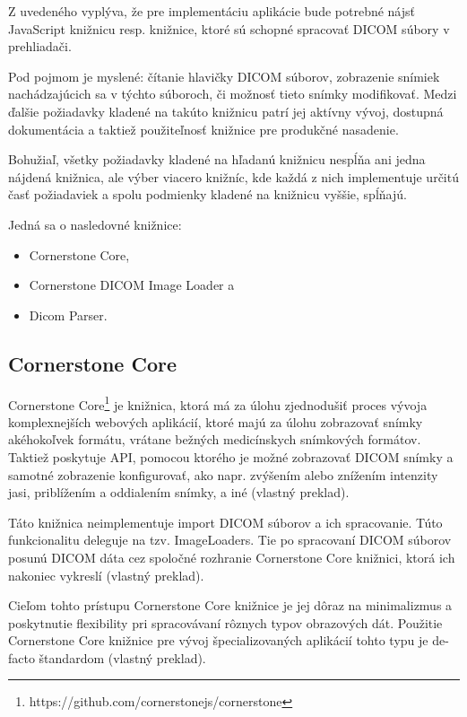 Z uvedeného vyplýva, že pre implementáciu aplikácie bude potrebné nájsť JavaScript knižnicu resp. knižnice, ktoré sú schopné spracovať DICOM súbory v prehliadači.

Pod pojmom  je myslené: čítanie hlavičky DICOM súborov, zobrazenie snímiek nachádzajúcich sa v týchto súboroch, či možnosť tieto snímky modifikovať. Medzi ďalšie požiadavky kladené na takúto knižnicu patrí jej aktívny vývoj, dostupná dokumentácia a taktiež použiteľnosť knižnice pre produkčné nasadenie.

Bohužiaľ, všetky požiadavky kladené na hľadanú knižnicu nespĺňa ani jedna nájdená knižnica, ale výber viacero knižníc, kde každá z nich implementuje určitú časť požiadaviek a spolu podmienky kladené na knižnicu vyššie, spĺňajú.

Jedná sa o nasledovné knižnice:
\begin {itemize}
\item {Cornerstone Core,}
\item {Cornerstone DICOM Image Loader a}
\item {Dicom Parser.}
\end {itemize}

\subsection {Cornerstone Core}
Cornerstone Core\footnote{https://github.com/cornerstonejs/cornerstone} je knižnica, ktorá má za úlohu zjednodušiť proces vývoja komplexnejších webových aplikácií, ktoré majú za úlohu zobrazovať snímky akéhokoľvek formátu, vrátane bežných medicínskych snímkových formátov. Taktiež poskytuje API, pomocou ktorého je možné zobrazovať DICOM snímky a samotné zobrazenie konfigurovať, ako napr. zvýšením alebo znížením intenzity jasi, priblížením a oddialením snímky, a iné \cite{about_cornerstone_core} (vlastný preklad).

Táto knižnica neimplementuje import DICOM súborov a ich spracovanie. Túto funkcionalitu deleguje na tzv. ImageLoaders. Tie po spracovaní DICOM súborov posunú DICOM dáta cez spoločné rozhranie Cornerstone Core knižnici, ktorá ich nakoniec vykreslí \cite{about_cornerstone_core} (vlastný preklad).

Cieľom tohto prístupu Cornerstone Core knižnice je jej dôraz na minimalizmus a poskytnutie flexibility pri spracovávaní rôznych typov obrazových dát. Použitie Cornerstone Core knižnice pre vývoj špecializovaných aplikácií tohto typu je de-facto štandardom \cite{about_cornerstone_core} (vlastný preklad).

